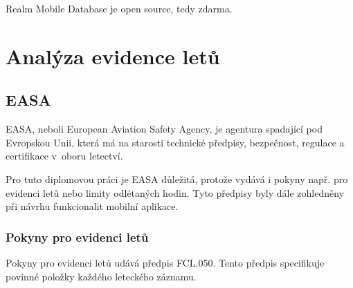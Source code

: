 \documentclass[thesis=M,czech]{FITthesis}[2012/06/26]
\begin{document}
Realm Mobile Database je open source, tedy zdarma. \cite{realmOverview}

\chapter{Analýza evidence letů}
\section{EASA}
EASA, neboli European Aviation Safety Agency, je agentura spadající pod Evropskou Unii, která má na starosti technické předpisy, bezpečnost, regulace a certifikace v~oboru letectví. \cite{EU} 

Pro tuto diplomovou práci je EASA důležitá, protože vydává i pokyny např. pro evidenci letů nebo limity odlétaných hodin. \cite{EASARegulations} Tyto předpisy byly dále zohledněny při návrhu funkcionalit mobilní aplikace.

\subsection{Pokyny pro evidenci letů}
Pokyny pro evidenci letů udává předpis FCL.050. Tento předpis specifikuje povinné položky každého leteckého záznamu. \cite{FCL} 
\end{document}
